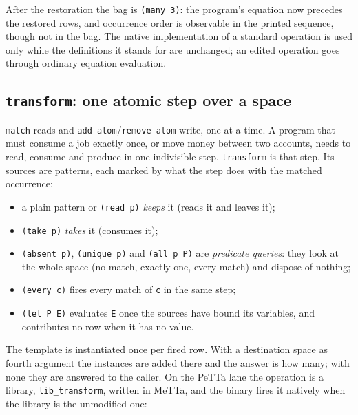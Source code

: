\documentclass[11pt]{article}
\newcommand{\code}[1]{\texttt{#1}}
\newcommand{\PeTTa}{\textup{PeTTa}}
\begin{document}
\noindent
After the restoration the bag is \code{(many 3)}: the program's equation now
precedes the restored rows, and occurrence order is observable in the printed
sequence, though not in the bag.  The native implementation of a standard
operation is used only while the definitions it stands for are unchanged; an
edited operation goes through ordinary equation evaluation.

\subsection{\code{transform}: one atomic step over a space}
\label{sec:tut-transform}

\code{match} reads and \code{add-atom}/\code{remove-atom} write, one at a time.
A program that must consume a job exactly once, or move money between two
accounts, needs to read, consume and produce in one indivisible step.
\code{transform} is that step.  Its sources are patterns, each marked by what
the step does with the matched occurrence:

\begin{itemize}
\item a plain pattern or \code{(read p)} \emph{keeps} it (reads it and leaves it);
\item \code{(take p)} \emph{takes} it (consumes it);
\item \code{(absent p)}, \code{(unique p)} and \code{(all p P)} are
  \emph{predicate queries}: they look at the whole space (no match, exactly one,
  every match) and dispose of nothing;
\item \code{(every c)} fires every match of \code{c} in the same step;
\item \code{(let P E)} evaluates \code{E} once the sources have bound its
  variables, and contributes no row when it has no value.
\end{itemize}

\noindent
The template is instantiated once per fired row.  With a destination space as
fourth argument the instances are added there and the answer is how many; with
none they are answered to the caller.  On the \PeTTa{} lane the operation is a
library, \code{lib\_transform}, written in MeTTa, and the binary fires it
natively when the library is the unmodified one:
\end{document}
